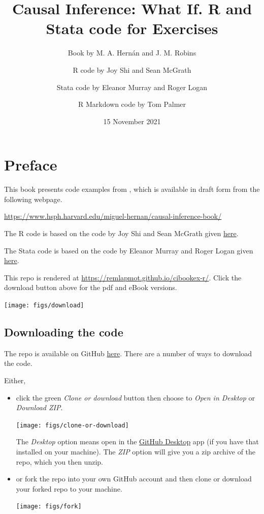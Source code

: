 \documentclass[
  10pt,
]{book}
\title{Causal Inference: What If. R and Stata code for Exercises}
\author{Book by M. A. Hernán and J. M. Robins \and R code by Joy Shi and Sean McGrath \and Stata code by Eleanor Murray and Roger Logan \and R Markdown code by Tom Palmer}
\date{15 November 2021}
\begin{document}
\maketitle

\thispagestyle{empty}

{
\setcounter{tocdepth}{1}
\tableofcontents
}
\hypertarget{preface}{%
\chapter*{Preface}\label{preface}}

This book presents code examples from \citet{ci-book}, which is available in draft form from the following webpage.

\url{https://www.hsph.harvard.edu/miguel-hernan/causal-inference-book/}

The R code is based on the code by Joy Shi and Sean McGrath given \href{https://cdn1.sph.harvard.edu/wp-content/uploads/sites/1268/1268/20/Rcode_CIpart2.zip}{here}.

The Stata code is based on the code by Eleanor Murray and Roger Logan given \href{https://cdn1.sph.harvard.edu/wp-content/uploads/sites/1268/2019/11/stata_part2.zip}{here}.

This repo is rendered at \url{https://remlapmot.github.io/cibookex-r/}. Click the download button above for the pdf and eBook versions.

\begin{center}\texttt{[image: figs/download]} \end{center}

\hypertarget{downloading-the-code}{%
\section{Downloading the code}\label{downloading-the-code}}

The repo is available on GitHub \href{https://github.com/remlapmot/cibookex-r}{here}. There are a number of ways to download the code.

Either,

\begin{itemize}
\item
  click the green \emph{Clone or download} button then choose to \emph{Open in Desktop} or \emph{Download ZIP}.

  \begin{center}\texttt{[image: figs/clone-or-download]} \end{center}

  The \emph{Desktop} option means open in the \href{https://desktop.github.com/}{GitHub Desktop} app (if you have that installed on your machine). The \emph{ZIP} option will give you a zip archive of the repo, which you then unzip.
\item
  or fork the repo into your own GitHub account and then clone or download your forked repo to your machine.

  \begin{center}\texttt{[image: figs/fork]} \end{center}
\end{itemize}
\end{document}
